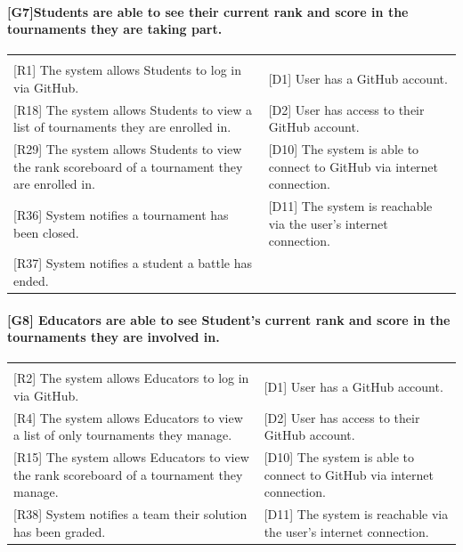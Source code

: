 \documentclass{article}
\begin{document}
\paragraph{[G7]Students are able to see their current rank and score in the tournaments they are taking part.}
\begin{center}
\begin{tabular}{|m{20em}|m{20em}|}
\hline
& \\
{[R1]} The system allows Students to log in via GitHub. &
{[D1]} User has a GitHub account.\\
{[R18]} The system allows Students to view a list of tournaments they are enrolled in. &
{[D2]} User has access to their GitHub account.\\
{[R29]} The system allows Students to view the rank scoreboard of a tournament they are enrolled in. &
{[D10]} The system is able to connect to GitHub via internet connection.\\
{[R36]} System notifies a tournament has been closed. &
{[D11]} The system is reachable via the user's internet connection.\\
{[R37]} System notifies a student a battle has ended. & \\
\hline
\end{tabular}
\end{center}

\paragraph{[G8] Educators are able to see Student's current rank and score in the tournaments they are involved in.}
\begin{center}
\begin{tabular}{|m{20em}|m{20em}|}
\hline
& \\
{[R2]} The system allows Educators to log in via GitHub. &
{[D1]} User has a GitHub account.\\
{[R4]} The system allows Educators to view a list of only tournaments they manage. &
{[D2]} User has access to their GitHub account.\\
{[R15]} The system allows Educators to view the rank scoreboard of a tournament they manage. &
{[D10]} The system is able to connect to GitHub via internet connection.\\
{[R38]} System notifies a team their solution has been graded. &
{[D11]} The system is reachable via the user's internet connection.\\
\hline
\end{tabular}
\end{center}
\end{document}
